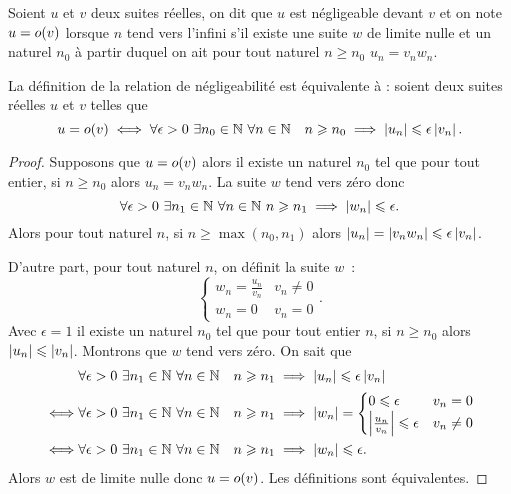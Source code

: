 \begin{defdef}
    Soient \(u\) et \(v\) deux suites réelles, on dit que \(u\) est négligeable 
    devant \(v\) et on note \(u = o\mathopen{}\left(v\right)\) lorsque \(n\) tend vers l'infini 
    s'il existe une suite \(w\) de limite nulle et un naturel \(n_0\) à partir 
    duquel on ait pour tout naturel \(n \geqslant n_0\) \(u_n = v_n w_n\).
\end{defdef}
\begin{prop}
    La définition de la relation de négligeabilité est équivalente à : soient deux 
    suites réelles \(u\) et \(v\) telles que
    \begin{equation}
        u = o\mathopen{}\left(v\right) \iff \forall \epsilon > 0 \ \exists n_0 \in \mathbb{N} \ \forall n 
        \in \mathbb{N} \quad n \geqslant n_0 \implies \left\lvert u_n\right\rvert \leqslant \epsilon 
        \left\lvert v_n\right\rvert.
    \end{equation}
\end{prop}
\begin{proof}
    Supposons que \(u = o\mathopen{}\left(v\right)\) alors il existe un naturel \(n_0\) tel que 
    pour tout entier, si \(n \geqslant n_0\) alors \(u_n = v_n w_n\). La suite 
    \(w\) tend vers zéro donc
    \begin{equation}
        \forall \epsilon > 0 \ \exists n_1 \in \mathbb{N} \ \forall n \in \mathbb{N} \ n \geqslant 
        n_1 \implies \left\lvert w_n\right\rvert \leqslant \epsilon.
    \end{equation}
    Alors pour tout naturel \(n\), si \(n \geqslant \max(n_0, n_1)\) alors 
    \(\left\lvert u_n\right\rvert = \left\lvert v_n w_n\right\rvert \leqslant \epsilon \left\lvert v_n\right\rvert\).

    D'autre part, pour tout naturel \(n\), on définit la suite \(w\)~:
    \begin{equation}
        \begin{cases}
            w_n = \frac{u_n}{v_n} & v_n \neq 0 \\ w_n = 0 & v_n = 0
        \end{cases}.
    \end{equation}
    Avec \(\epsilon = 1\) il existe un naturel \(n_0\) tel que pour tout entier 
    \(n\), si \(n \geqslant n_0\) alors \(\left\lvert u_n\right\rvert \leqslant \left\lvert v_n\right\rvert\). 
    Montrons que \(w\) tend vers zéro. On sait que
    \begin{align}
        & \forall \epsilon > 0 \ \exists n_1 \in \N \ \forall n \in \N \quad n 
        \geqslant n_1 \implies \abs{u_n} \leqslant \epsilon \abs{v_n} \\ \iff & 
        \forall \epsilon > 0 \ \exists n_1 \in \N \ \forall n \in \N \quad n 
        \geqslant n_1 \implies \abs{w_n}= \begin{cases} 0 \leqslant \epsilon & v_n 
        = 0 \\ \abs{\frac{u_n}{v_n}} \leqslant \epsilon & v_n\neq 0 \end{cases} \\
        \iff & \forall \epsilon > 0 \ \exists n_1 \in \N \ \forall n \in \N 
        \quad n \geqslant n_1 \implies \abs{w_n} \leqslant \epsilon.
    \end{align}
    Alors \(w\) est de limite nulle donc \(u = o\mathopen{}\left(v\right)\). Les définitions 
    sont équivalentes.
\end{proof}
